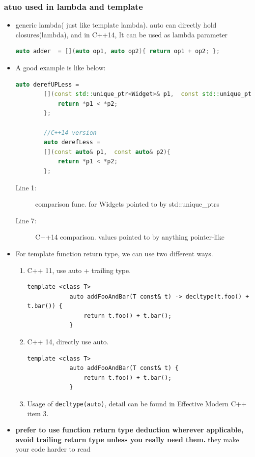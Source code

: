 \documentclass[a4paper,11pt,twoside]{book}
\begin{document}
\subsubsection{atuo used in lambda and template}
\begin{itemize}
	\item generic lambda( just like template lambda). auto can directly hold closures(lambda), and in C++14, It can be used as lambda parameter
	\begin{lstlisting}[frame=single, language=c++]
		auto adder  = [](auto op1, auto op2){ return op1 + op2; };
	\end{lstlisting}
	
	\item A good example is like below:
	\begin{lstlisting}[frame=single, language=c++]
		auto derefUPLess =               
		[](const std::unique_ptr<Widget>& p1,  const std::unique_ptr<Widget>& p2){
			return *p1 < *p2; 
		};                 
		
		//C++14 version
		auto derefLess = 
		[](const auto& p1,  const auto& p2){
			return *p1 < *p2; 
		}; 
	\end{lstlisting}
	\begin{description}
		\item[Line 1:] comparison func. for Widgets pointed to by std::unique\_ptrs
		\item[Line 7:] C++14 comparison. values pointed to by anything pointer-like
	\end{description}
	
	
	\item For template function return type, we can use two different ways.
	
	\begin{enumerate}
		\item C++ 11, use auto + trailing type.
		\begin{lstlisting}[numbers=none]
			template <class T>
			auto addFooAndBar(T const& t) -> decltype(t.foo() + t.bar()) {
				return t.foo() + t.bar();
			}
		\end{lstlisting}
		\item C++ 14, directly use auto.
		\begin{lstlisting}[numbers=none]
			template <class T>
			auto addFooAndBar(T const& t) {
				return t.foo() + t.bar();
			}
		\end{lstlisting}
		\item Usage of \texttt{decltype(auto)}, detail can be found in Effective Modern C++ item 3.
	\end{enumerate}
	
	\item \textbf{prefer to use function return type deduction wherever applicable, avoid trailing return type unless you really need them.} they make your code harder to read
	
\end{itemize}
\end{document}
